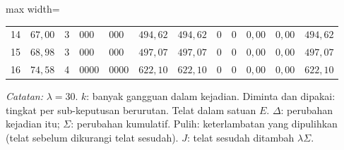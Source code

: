 \begin{table}[htbp]
\begin{adjustbox}{max width=\textwidth}
\begin{tabular}{rrcllrrrrrrr}
14 & $67{,}00$ & 3 & 000 & 000 & $494{,}62$ & $494{,}62$ & 0 & 0 & $0{,}00$ & $0{,}00$ & $494{,}62$ \\
15 & $68{,}98$ & 3 & 000 & 000 & $497{,}07$ & $497{,}07$ & 0 & 0 & $0{,}00$ & $0{,}00$ & $497{,}07$ \\
16 & $74{,}58$ & 4 & 0000 & 0000 & $622{,}10$ & $622{,}10$ & 0 & 0 & $0{,}00$ & $0{,}00$ & $622{,}10$ \\
\bottomrule
\end{tabular}
\end{adjustbox}
\par\smallskip\footnotesize\textit{Catatan:} $\lambda = 30$. $k$: banyak gangguan dalam kejadian. Diminta dan dipakai: tingkat per sub-keputusan berurutan. Telat dalam satuan $E$. $\Delta$: perubahan kejadian itu; $\Sigma$: perubahan kumulatif. Pulih: keterlambatan yang dipulihkan (telat sebelum dikurangi telat sesudah). $J$: telat sesudah ditambah $\lambda\Sigma$.
\end{table}
